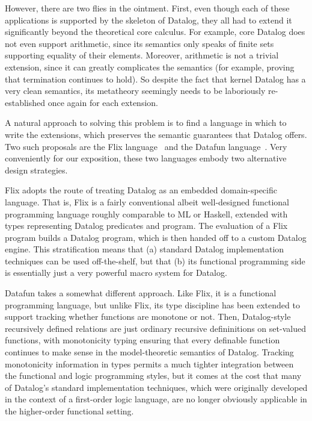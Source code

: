 However, there are two flies in the ointment. First, even though each
of these applications is supported by the skeleton of Datalog, they
all had to extend it significantly beyond the theoretical core
calculus.  For example, core Datalog does not even support arithmetic,
since its semantics only speaks of finite sets supporting equality of
their elements. Moreover, arithmetic is not a trivial extension, since
it can greatly complicates the semantics (for example, proving that
termination continues to hold). So despite the fact that kernel
Datalog has a very clean semantics, its metatheory seemingly needs to
be laboriously re-established once again for each extension.

A natural approach to solving this problem is to find a language in
which to write the extensions, which preserves the semantic guarantees
that Datalog offers. Two such proposals are the Flix
language~\cite{flix} and the Datafun language~\cite{datafun}.  Very
conveniently for our exposition, these two languages embody two
alternative design strategies.

Flix adopts the route of treating Datalog as an embedded
domain-specific language. That is, Flix is a fairly conventional
albeit well-designed functional programming language roughly
comparable to ML or Haskell, extended with types representing Datalog
predicates and program. The evaluation of a Flix program builds a
Datalog program, which is then handed off to a custom Datalog engine.
This stratification means that (a) standard Datalog implementation
techniques can be used off-the-shelf, but that (b) its functional
programming side is essentially just a very powerful macro system for
Datalog.

Datafun takes a somewhat different approach. Like Flix, it is a
functional programming language, but unlike Flix, its type discipline
has been extended to support tracking whether functions are monotone
or not. Then, Datalog-style recursively defined relations are just
ordinary recursive defininitions on set-valued functions, with
monotonicity typing ensuring that every definable function continues to
make sense in the model-theoretic semantics of Datalog. Tracking
monotonicity information in types permits a much tighter integration
between the functional and logic programming styles, but it comes at
the cost that many of Datalog's standard implementation techniques,
which were originally developed in the context of a first-order logic
language, are no longer obviously applicable in the higher-order
functional setting.

